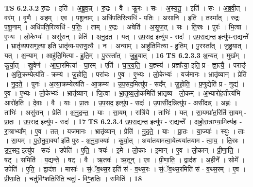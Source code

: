 \documentclass[17pt]{extarticle}
\begin{document}
                  \newline
                                \textbf{ TS 6.2.3.2} \newline
                  रु॒द्रः । इति॑ । अ॒ब्रु॒व॒न्न् । रु॒द्रः । वै । क्रू॒रः । सः । अ॒स्य॒तु॒ । इति॑ । सः । अ॒ब्र॒वी॒त् । वर᳚म् । वृ॒णै॒ । अ॒हम् । ए॒व । प॒शू॒नाम् । अधि॑पति॒रित्यधि॑ - प॒तिः॒ । अ॒सा॒नि॒ । इति॑ । तस्मा᳚त् । रु॒द्रः । प॒शू॒नाम् । अधि॑पति॒रित्यधि॑ - प॒तिः॒ । ताम् । रु॒द्रः । अवेति॑ । अ॒सृ॒ज॒त् । सः । ति॒स्रः । पुरः॑ । भि॒त्वा । ए॒भ्यः । लो॒केभ्यः॑ । असु॑रान् । प्रेति॑ । अ॒नु॒द॒त॒ । यत् । उ॒प॒सद॒ इत्यु॑प - सदः॑ । उ॒प॒स॒द्यन्त॒ इत्यु॑प-स॒द्यन्ते᳚ । भ्रातृ॑व्यपराणुत्या॒ इति॒ भ्रातृ॑व्य-प॒रा॒णु॒त्यै॒ । न । अ॒न्याम् । आहु॑ति॒मित्या - हु॒ति॒म् । पु॒रस्ता᳚त् । जु॒हु॒या॒त् । यत् । अ॒न्याम् । आहु॑ति॒मित्या - हु॒ति॒म् । पु॒रस्ता᳚त् । जु॒हु॒यात् । \textbf{  16} \newline
                  \newline
                                \textbf{ TS 6.2.3.3} \newline
                  अ॒न्यत् । मुख᳚म् । कु॒र्या॒त् । स्रु॒वेण॑ । आ॒घा॒रमित्या᳚ - घा॒रम् । एति॑ । घा॒र॒य॒ति॒ । य॒ज्ञ्स्य॑ । प्रज्ञा᳚त्या॒ इति॒ प्र - ज्ञा॒त्यै॒ । पराङ्॑ । अ॒ति॒क्रम्येत्य॑ति - क्रम्य॑ । जु॒हो॒ति॒ । परा॑चः । ए॒व । ए॒भ्यः । लो॒केभ्यः॑ । यज॑मानः । भ्रातृ॑व्यान् । प्रेति॑ । नु॒द॒ते॒ । पुनः॑ । अ॒त्या॒क्रम्येत्य॑ति - आ॒क्रम्य॑ । उ॒प॒सद॒मित्यु॑प - सद᳚म् । जु॒हो॒ति॒ । प्र॒णुद्येति॑ प्र - नुद्य॑ । ए॒व । ए॒भ्यः । लो॒केभ्यः॑ । भ्रातृ॑व्यान् । जि॒त्वा । भ्रा॒तृ॒व्य॒लो॒कमिति॑ भ्रातृव्य - लो॒कम् । अ॒भ्यारो॑ह॒तीत्य॑भि - आरो॑हति । दे॒वाः । वै । याः । प्रा॒तः । उ॒प॒सद॒ इत्यु॑प - सदः॑ । उ॒पासी॑द॒न्नित्यु॑प - असी॑दन्न् । अह्नः॑ । ताभिः॑ । असु॑रान् । प्रेति॑ । अ॒नु॒द॒न्त॒ । याः । सा॒यम् । रात्रि॑यै । ताभिः॑ । यत् । सा॒यम्प्रा॑त॒रिति॑ सा॒यम् - प्रा॒तः॒ । उ॒प॒सद॒ इत्यु॑प - सदः॑ । \textbf{  17} \newline
                  \newline
                                \textbf{ TS 6.2.3.4} \newline
                  उ॒प॒स॒द्यन्त॒ इत्यु॑प - स॒द्यन्ते᳚ । अ॒हो॒रा॒त्राभ्या॒मित्य॑हः - रा॒त्राभ्या᳚म् । ए॒व । तत् । यज॑मानः । भ्रातृ॑व्यान् । प्रेति॑ । नु॒द॒ते॒ । याः । प्रा॒तः । या॒ज्याः᳚ । स्युः । ताः । सा॒यम् । पु॒रो॒नु॒वा॒क्या॑ इति॑ पुरः - अ॒नु॒वा॒क्याः᳚ । कु॒र्या॒त् । अया॑तयामत्वा॒येत्यया॑तयाम - त्वा॒य॒ । ति॒स्रः । उ॒प॒सद॒ इत्यु॑प - सदः॑ । उपेति॑ । ए॒ति॒ । त्रयः॑ । इ॒मे । लो॒काः । इ॒मान् । ए॒व । लो॒कान् । प्री॒णा॒ति॒ । षट् । समिति॑ । प॒द्य॒न्ते॒ । षट् । वै । ऋ॒तवः॑ । ऋ॒तून् । ए॒व । प्री॒णा॒ति॒ । द्वाद॑श । अ॒हीने᳚ । सोमे᳚ । उपेति॑ । ए॒ति॒ । द्वाद॑श । मासाः᳚ । सं॒ॅव॒थ्स॒र इति॑ सं - व॒थ्स॒रः । सं॒ॅव॒थ्स॒रमिति॑ सं - व॒थ्स॒रम् । ए॒व । प्री॒णा॒ति॒ । चतु॑र्विꣳशति॒रिति॒ चतुः॑ - विꣳ॒॒श॒तिः॒ । समिति॑ । \textbf{  18} \newline
\end{document}
